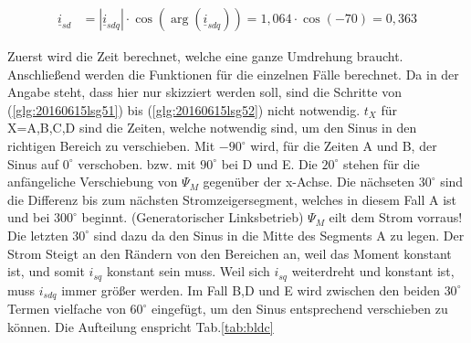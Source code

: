 \begin{solution}
\begin{compactenum}
\begin{align}
			\underline{i}_{sd} & = |\underline{i}_{sdq}| \cdot \cos(\arg(\underline{i}_{sdq}))=1,064 \cdot \cos(-70)=0,363
		\end{align}
		\item 
		\begin{figure}[H]
			\label{fig:20160615lsg13}
		\end{figure}
		\item Zuerst wird die Zeit berechnet, welche eine ganze Umdrehung braucht. Anschließend werden die Funktionen für die einzelnen Fälle berechnet. Da in der Angabe steht, dass hier nur skizziert werden soll, sind die Schritte von (\ref{glg:20160615lsg51}) bis (\ref{glg:20160615lsg52}) nicht notwendig. $t_X$ für X=A,B,C,D sind die Zeiten, welche notwendig sind, um den Sinus in den richtigen Bereich zu verschieben. Mit $-90^\circ$ wird, für die Zeiten A und B, der Sinus auf $0^\circ$ verschoben. bzw. mit $90^\circ$ bei D und E. Die $20^\circ$ stehen für die anfängeliche Verschiebung von $\Psi_M$ gegenüber der x-Achse. Die nächseten $30^\circ$ sind die Differenz bis zum nächsten Stromzeigersegment, welches in diesem Fall A ist und bei $300^\circ$ beginnt. (Generatorischer Linksbetrieb) $\Psi_M$ eilt dem Strom vorraus! Die letzten $30^\circ$ sind dazu da den Sinus in die Mitte des Segments A zu legen. Der Strom Steigt an den Rändern von den Bereichen an, weil das Moment konstant ist, und somit $i_{sq}$ konstant sein muss. Weil sich $i_{sq}$ weiterdreht und konstant ist, muss $i_{sdq}$ immer größer werden. Im Fall B,D und E wird zwischen den beiden $30^\circ$ Termen vielfache von $60^\circ$ eingefügt, um den Sinus entsprechend verschieben zu können. Die Aufteilung enspricht Tab.\ref{tab:bldc} 

\end{compactenum}
\end{solution}
